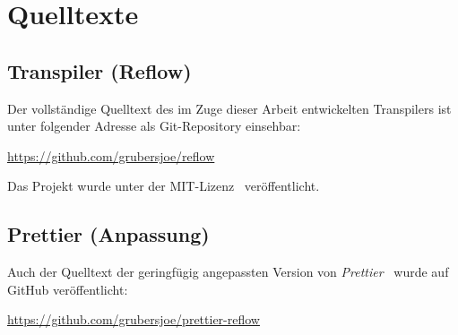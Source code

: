 \appendix
\chapter{Quelltexte}

\section{Transpiler (Reflow)}

Der vollständige Quelltext des im Zuge dieser Arbeit entwickelten Transpilers ist unter folgender Adresse als Git-Repository einsehbar:

\url{https://github.com/grubersjoe/reflow}

Das Projekt wurde unter der MIT-Lizenz~\autocite{LICENSE:MIT} veröffentlicht.

\section{Prettier (Anpassung)}
\label{appendix:prettier}

Auch der Quelltext der geringfügig angepassten Version von \textit{Prettier}~\autocite{SOFTWARE:PRETTIER} wurde auf GitHub veröffentlicht:

\url{https://github.com/grubersjoe/prettier-reflow}
